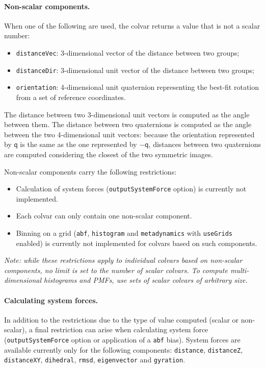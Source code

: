 \paragraph*{Non-scalar components.}  When one of the following are
used, the colvar returns a value that is not a scalar number:
\begin{itemize}
\item \texttt{distanceVec}: 3-dimensional vector of the distance
  between two groups;
\item \texttt{distanceDir}: 3-dimensional unit vector of the distance
  between two groups;
\item \texttt{orientation}: 4-dimensional unit quaternion representing
  the best-fit rotation from a set of reference coordinates.
\end{itemize}
The distance between two 3-dimensional unit vectors is computed as the
angle between them.  The distance between two quaternions is computed
as the angle between the two 4-dimensional unit vectors: because the
orientation represented by $\mathsf{q}$ is the same as the one
represented by $-\mathsf{q}$, distances between two quaternions are
computed considering the closest of the two symmetric images.

Non-scalar components carry the following restrictions:
\begin{itemize}
\item Calculation of system forces (\texttt{outputSystemForce} option)
  is currently not implemented.
\item Each colvar can only contain one non-scalar component.
\item Binning on a grid (\texttt{abf}, \texttt{histogram} and
  \texttt{metadynamics} with \texttt{useGrids} enabled) is currently
  not implemented for colvars based on such components.
\end{itemize}

\emph{Note: while these restrictions apply to individual colvars based
  on non-scalar components, no limit is set to the number of scalar
  colvars.  To compute multi-dimensional histograms and PMFs, use sets
  of scalar colvars of arbitrary size.}


\paragraph*{Calculating system forces.}  In addition to the
restrictions due to the type of value computed (scalar or non-scalar),
a final restriction can arise when calculating system force
(\texttt{outputSystemForce} option or application of a \texttt{abf}
bias).  System forces are available currently only for the following
components: \texttt{distance}, \texttt{distanceZ},
\texttt{distanceXY}, \texttt{dihedral}, \texttt{rmsd},
\texttt{eigenvector} and \texttt{gyration}.


